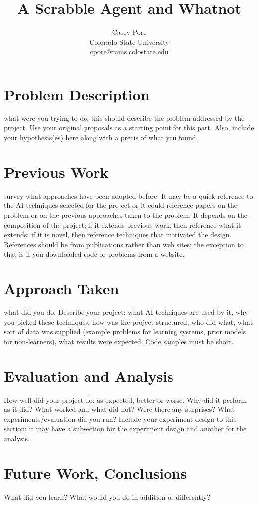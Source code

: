 \documentclass[letterpaper]{article}
\title{A Scrabble Agent and Whatnot}
\author{Casey Pore \\
Colorado State University\\
cpore@rams.colostate.edu\\
}
\begin{document}
\maketitle

\section{Problem Description}
what were you trying to do; this should describe the problem addressed by the project. Use your original proposals as a starting point for this part. Also, include your hypothesis(es) here along with a precis of what you found.

\section{Previous Work}
survey what approaches have been adopted before. It may be a quick reference to the AI techniques selected for the project or it could reference papers on the problem or on the previous approaches taken to the problem. It depends on the composition of the project; if it extends previous work, then reference what it extends; if it is novel, then reference techniques that motivated the design. References should be from publications rather than web sites; the exception to that is if you downloaded code or problems from a website.

\section{Approach Taken}
what did you do. Describe your project: what AI techniques are used by it, why you picked these techniques, how was the project structured, who did what, what sort of data was supplied (example problems for learning systems, prior models for non-learners), what results were expected. Code samples must be short.

\section{Evaluation and Analysis}
How well did your project do: as expected, better or worse. Why did it perform as it did? What worked and what did not? Were there any surprises? What experiments/evaluation did you run? Include your experiment design to this section; it may have a subsection for the experiment design and another for the analysis.

\section{Future Work, Conclusions}
What did you learn? What would you do in addition or differently? \cite{Torre2008}





\end{document}
